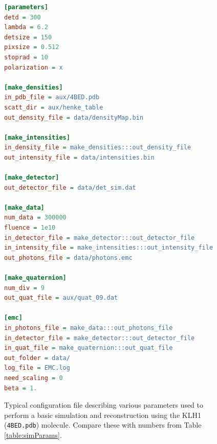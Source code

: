 \documentclass[]{iucr}              %
\begin{document}
\begin{figure}
\begin{lstlisting}[language=ini]
[parameters]
detd = 300
lambda = 6.2
detsize = 150
pixsize = 0.512
stoprad = 10
polarization = x

[make_densities]
in_pdb_file = aux/4BED.pdb
scatt_dir = aux/henke_table
out_density_file = data/densityMap.bin

[make_intensities]
in_density_file = make_densities:::out_density_file
out_intensity_file = data/intensities.bin

[make_detector]
out_detector_file = data/det_sim.dat

[make_data]
num_data = 300000
fluence = 1e10
in_detector_file = make_detector:::out_detector_file
in_intensity_file = make_intensities:::out_intensity_file
out_photons_file = data/photons.emc

[make_quaternion]
num_div = 9
out_quat_file = aux/quat_09.dat

[emc]
in_photons_file = make_data:::out_photons_file
in_detector_file = make_detector:::out_detector_file
in_quat_file = make_quaternion:::out_quat_file
out_folder = data/
log_file = EMC.log
need_scaling = 0
beta = 1.
\end{lstlisting}
\caption{Typical configuration file describing various parameters used to perform a basic simulation and reconstruction using the KLH1 (\texttt{4BED.pdb}) molecule. Compare these with numbers from Table \ref{table:simParams}.}
\label{fig:config}
\end{figure}
\end{document}
